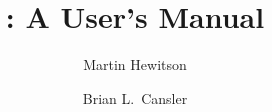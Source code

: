 \documentclass[12pt]{report}
\title{\texnicle: A User's Manual}
\author{Martin Hewitson \and Brian L.\ Cansler}
\begin{document}
\normalem



\tableofcontents







\appendix


\end{document}
